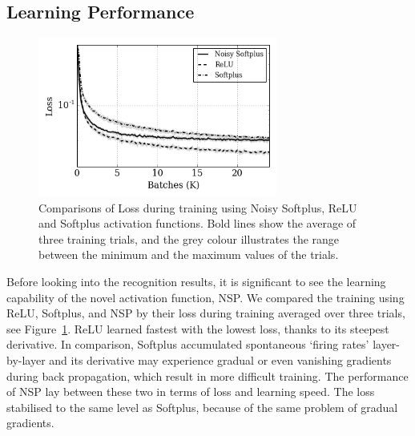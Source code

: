 	\subsection{Learning Performance}
	\label{subsec:result_compare}
	\begin{figure}[tbp!]
		\centering
		\includegraphics[width=0.7\textwidth]{pics_iconip/8.png}
		\caption[Comparisons of Loss during training.]{Comparisons of Loss during training using Noisy Softplus, ReLU and Softplus activation functions. Bold lines show the average of three training trials, and the grey colour illustrates the range between the minimum and the maximum values of the trials.  }
		\label{Fig:loss_ns}
	\end{figure}
	Before looking into the recognition results, it is significant to see the learning capability of the novel activation function, NSP.
	We compared the training using ReLU, Softplus, and NSP by their loss during training averaged over three trials, see Figure~\ref{Fig:loss_ns}.
	ReLU learned fastest with the lowest loss, thanks to its steepest derivative.
	In comparison, Softplus accumulated spontaneous `firing rates' layer-by-layer and its derivative may experience gradual or even vanishing gradients during back propagation, which result in more difficult training.
	The performance of NSP lay between these two in terms of loss and learning speed.
	The loss stabilised to the same level as Softplus, because of the same problem of gradual gradients.
	
